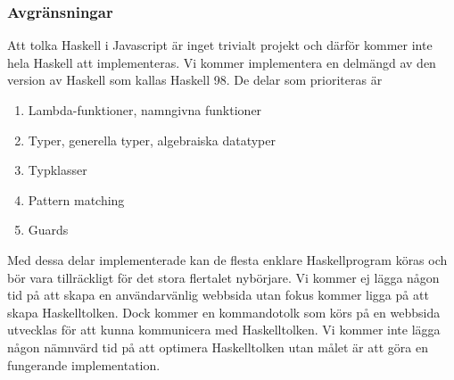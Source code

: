 



\subsubsection{Avgränsningar} 
Att tolka Haskell i Javascript är inget trivialt projekt och därför kommer inte hela Haskell att implementeras. Vi kommer implementera en delmängd av den version av Haskell som kallas Haskell 98.
De delar som prioriteras är
        \begin{enumerate}
            \item{Lambda-funktioner, namngivna funktioner}
            \item{Typer, generella typer, algebraiska datatyper}
            \item{Typklasser}
            \item{Pattern matching}
            \item{Guards}
        \end{enumerate}
Med dessa delar implementerade kan de flesta enklare Haskellprogram köras och bör vara tillräckligt för det stora flertalet nybörjare. Vi kommer ej lägga någon tid på att skapa en användarvänlig webbsida utan fokus kommer ligga på att skapa Haskelltolken. Dock kommer en kommandotolk som körs på en webbsida utvecklas för att kunna kommunicera med Haskelltolken. 
Vi kommer inte lägga någon nämnvärd tid på att optimera Haskelltolken utan målet är att göra en fungerande implementation. 

